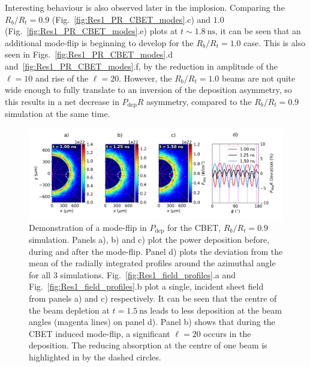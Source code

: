 Interesting behaviour is also observed later in the implosion.
Comparing the $R_b/R_t=0.9$ (Fig.~\ref{fig:Res1_PR_CBET_modes}.c) and $1.0$ (Fig.~\ref{fig:Res1_PR_CBET_modes}.e) plots at $t\sim1.8\ \text{ns}$, it can be seen that an additional mode-flip is beginning to develop for the $R_b/R_t=1.0$ case.
This is also seen in Figs.~\ref{fig:Res1_PR_CBET_modes}.d and~\ref{fig:Res1_PR_CBET_modes}.f, by the reduction in amplitude of the $\ell=10$ and rise of the $\ell=20$.
However, the $R_b/R_t=1.0$ beams are not quite wide enough to fully translate to an inversion of the deposition asymmetry, so this results in a net decrease in $P_{\text{dep}}R$ asymmetry, compared to the $R_b/R_t=0.9$ simulation at the same time.

\begin{figure}[t!]
    \includegraphics[width=\linewidth]{Results1/Images/CBET_modeflip.png}
    \centering
    \caption{Demonstration of a mode-flip in $P_{\text{dep}}$ for the \ac{CBET}, $R_b/R_t=0.9$ simulation.
    Panels a), b) and c) plot the power deposition before, during and after the mode-flip.
    Panel d) plots the deviation from the mean of the radially integrated profiles around the azimuthal angle for all 3 simulations.
    Fig.~\ref{fig:Res1_field_profiles}.a and Fig.~\ref{fig:Res1_field_profiles}.b plot a single, incident sheet field from panels a) and c) respectively.
    It can be seen that the centre of the beam depletion at $t=1.5\ \text{ns}$ leads to less deposition at the beam angles (magenta lines) on panel d).
    Panel b) shows that during the \ac{CBET} induced mode-flip, a significant $\ell=20$ occurs in the deposition.
    The reducing absorption at the centre of one beam is highlighted in by the dashed circles.}%
    \label{fig:Res1_CBET_Deposition_change}
\end{figure}

